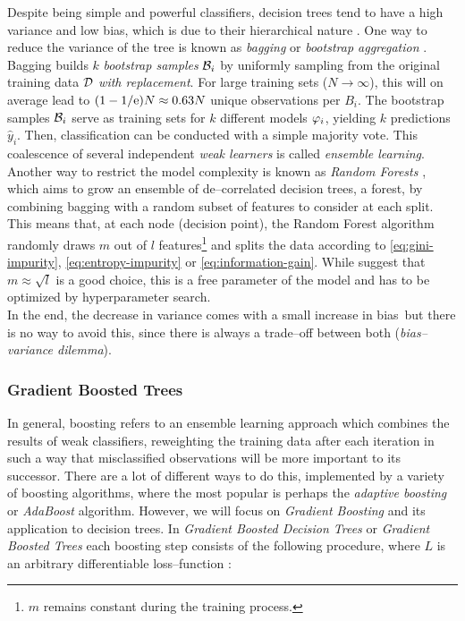 Despite being simple and powerful classifiers, decision trees tend to have a high variance and low bias, which is due to their hierarchical nature \citep{richards2011}. One way to reduce the variance of the tree is known as \emph{bagging} or \emph{bootstrap aggregation} \citep{breiman1996}. Bagging builds $k$ \emph{bootstrap samples} $\mathcal{B}_i$ by uniformly sampling from the original training data $\mathcal{D}$ \emph{with replacement}. For large training sets ($N \to \infty$), this will on average lead to $(1 - 1/\mathrm{e}) N \approx 0.63 N$ unique observations per $B_i$. The bootstrap samples $\mathcal{B}_i$ serve as training sets for $k$ different models $\varphi_i$, yielding $k$ predictions $\hat y_i$. Then, classification can be conducted with a simple majority vote. This coalescence of several independent \emph{weak learners} is called \emph{ensemble learning}. Another way to restrict the model complexity is known as \emph{Random Forests} \citep{breiman2001}, which aims to grow an ensemble of de--correlated decision trees, a forest, by combining bagging with a random subset of features to consider at each split. This means that, at each node (decision point), the Random Forest algorithm randomly draws $m$ out of $l$ features\footnote{$m$ remains constant during the training process.} and splits the data according to \eqref{eq:gini-impurity}, \eqref{eq:entropy-impurity} or \eqref{eq:information-gain}. While \citeauthor{breiman2001} suggest that $m \approx \sqrt{l}$ is a good choice, this is a free parameter of the model and has to be optimized by hyperparameter search.\\

In the end, the decrease in variance comes with a small increase in bias\, but there is no way to avoid this, since there is always a trade--off between both (\emph{bias--variance dilemma}).



\subsubsection{Gradient Boosted Trees}

In general, boosting refers to an ensemble learning approach which combines the results of weak classifiers, reweighting the training data after each iteration in such a way that misclassified observations will be more important to its successor. There are a lot of different ways to do this, implemented by a variety of boosting algorithms, where the most popular is perhaps the \emph{adaptive boosting} or \emph{AdaBoost} algorithm. However, we will focus on \emph{Gradient Boosting} \citep{friedman2001,friedman2002} and its application to decision trees. In \emph{Gradient Boosted Decision Trees} or \emph{Gradient Boosted Trees} each boosting step consists of the following procedure, where $L$ is an arbitrary differentiable loss--function \citep{hastie2001}:

